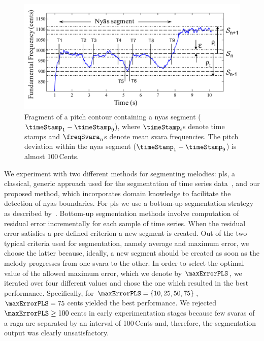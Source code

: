 {\begin{figure}
	\begin{center}
		\includegraphics[width=\figSizeNinety]{ch05_preprocessing/figures/NyasSegmentationMethod.pdf}
	\end{center}
	\caption[Illustration of \gls{nyas} segmentation process]{Fragment of a pitch contour containing a \gls{nyas} segment ($\timeStamp_1-\timeStamp_9$), where $\timeStamp_i$s denote time stamps and $\freqSvara_n$s denote mean \gls{svara} frequencies. The pitch deviation within the \gls{nyas} segment ($\timeStamp_1-\timeStamp_9$) is almost 100\,Cents.}
	\label{fig:nyas_segmentation_illustration}
\end{figure}

We experiment with two different methods for segmenting melodies: \gls{pls}, a classical, generic approach used for the segmentation of time series data~\citep{keogh2004segmenting}, and our proposed method, which incorporates domain knowledge to facilitate the detection of \gls{nyas} boundaries. For \gls{pls} we use a bottom-up segmentation strategy as described by~\cite{keogh2004segmenting}. Bottom-up segmentation methods involve computation of residual error incrementally for each sample of time series. When the residual error satisfies a pre-defined criterion a new segment is created. Out of the two typical criteria used for segmentation, namely average and maximum error, we choose the latter because, ideally, a new segment should be created as soon as the melody progresses from one \gls{svara} to the other. In order to select the optimal value of the allowed maximum error, which we denote by $\maxErrorPLS$, we iterated over four different values and chose the one which resulted in the best performance. Specifically, for $\maxErrorPLS=\lbrace 10, 25, 50, 75\rbrace$, $\maxErrorPLS=75$\,cents yielded the best performance. We rejected $\maxErrorPLS\geq 100$\,cents in early experimentation stages because few \glspl{svara} of a \gls{raga} are separated by an interval of 100\,Cents and, therefore, the segmentation output was clearly unsatisfactory.

}
